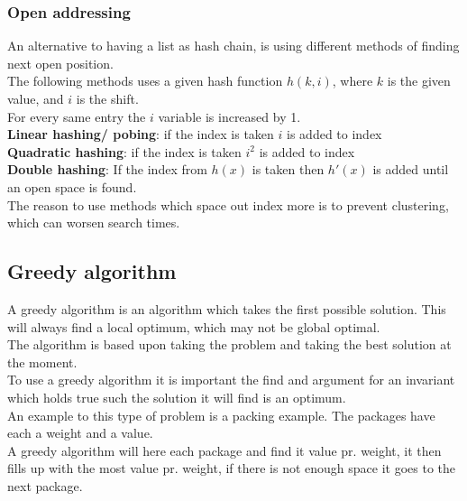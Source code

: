 \documentclass[12pt, a4paper]{article}
\begin{document}
				\subsubsection{Open addressing}
					An alternative to having a list as hash chain, is using different methods of finding next open position.\\
					The following methods uses a given hash function $h(k,i)$, where $k$ is the given value, and $i$ is the shift.\\
					For every same entry the $i$ variable is increased by 1.\\
					\textbf{Linear hashing/ pobing}: if the index is taken $i$ is added to index\\
					\textbf{Quadratic hashing}: if the index is taken $i^2$ is added to index\\
					\textbf{Double hashing}: If the index from $h(x)$ is taken then $h'(x)$ is added until an open space is found.\\
					The reason to use methods which space out index more is to prevent clustering, which can worsen search times.
			\subsection{Greedy algorithm}
				A greedy algorithm is an algorithm which takes the first possible solution. This will always find a local optimum, which may not be global optimal.\\
				The algorithm is based upon taking the problem and taking the best solution at the moment.\\
				To use a greedy algorithm it is important the find and argument for an invariant which holds true such the solution it will find is an optimum.\\[4mm]
				An example to this type of problem is a packing example. The packages have each a weight and a value.\\
				A greedy algorithm will here each package and find it value pr. weight, it then fills up with the most value pr. weight, if there is not enough space it goes to the next package.\\
\end{document}
